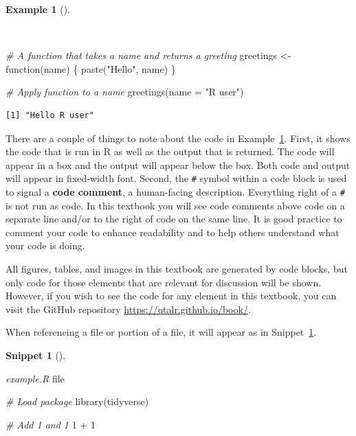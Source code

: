\documentclass[
  letterpaper,
  krantz1]{latex/krantz-mod}
\newenvironment{Shaded}{\begin{snugshade}}{\end{snugshade}}
\newcommand{\AttributeTok}[1]{\textcolor[rgb]{0.00,0.00,0.00}{#1}}
\newcommand{\CommentTok}[1]{\textcolor[rgb]{0.00,0.00,0.00}{\textit{#1}}}
\newcommand{\ControlFlowTok}[1]{\textcolor[rgb]{0.00,0.00,0.00}{#1}}
\newcommand{\DecValTok}[1]{\textcolor[rgb]{0.00,0.00,0.00}{#1}}
\newcommand{\FunctionTok}[1]{\textcolor[rgb]{0.00,0.00,0.00}{#1}}
\newcommand{\NormalTok}[1]{\textcolor[rgb]{0.00,0.00,0.00}{#1}}
\newcommand{\OtherTok}[1]{\textcolor[rgb]{0.00,0.00,0.00}{#1}}
\newcommand{\SpecialCharTok}[1]{\textcolor[rgb]{0.00,0.00,0.00}{#1}}
\newcommand{\StringTok}[1]{\textcolor[rgb]{0.00,0.00,0.00}{#1}}
\theoremstyle{definition}
\newtheorem{definition}{Snippet}[chapter]
\theoremstyle{definition}
\newtheorem{example}{Example}[chapter]
\theoremstyle{remark}
\begin{document}
\begin{example}[]\protect\hypertarget{exm-code-block}{}\label{exm-code-block}

~

\begin{Shaded}
\begin{Highlighting}[numbers=left,,]
\CommentTok{\# A function that takes a name and returns a greeting}
\NormalTok{greetings }\OtherTok{\textless{}{-}} \ControlFlowTok{function}\NormalTok{(name) \{}
  \FunctionTok{paste}\NormalTok{(}\StringTok{"Hello"}\NormalTok{, name)}
\NormalTok{\}}

\CommentTok{\# Apply function to a name}
\FunctionTok{greetings}\NormalTok{(}\AttributeTok{name =} \StringTok{"R user"}\NormalTok{) }
\end{Highlighting}
\end{Shaded}

\begin{verbatim}
[1] "Hello R user"
\end{verbatim}

\end{example}

 

There are a couple of things to note about the code in
Example~\ref{exm-code-block}. First, it shows the code that is run in R
as well as the output that is returned. The code will appear in a box
and the output will appear below the box. Both code and output will
appear in fixed-width font. Second, the \texttt{\#} symbol within a code
block is used to signal a \textbf{code comment}, a
human-facing description. Everything right of a \texttt{\#} is not run
as code. In this textbook you will see code comments above code on a
separate line and/or to the right of code on the same line. It is good
practice to comment your code to enhance readability and to help others
understand what your code is doing.

All figures, tables, and images in this textbook are generated by code
blocks, but only code for those elements that are relevant for
discussion will be shown. However, if you wish to see the code for any
element in this textbook, you can visit the GitHub repository
\url{https://qtalr.github.io/book/}.

When referencing a file or portion of a file, it will appear as in
Snippet~\ref{def-r-code}.

\begin{definition}[]\protect\hypertarget{def-r-code}{}\label{def-r-code}

\emph{example.R} file

\begin{Shaded}
\begin{Highlighting}[numbers=left,,]
\CommentTok{\# Load package}
\FunctionTok{library}\NormalTok{(tidyverse)}

\CommentTok{\# Add 1 and 1}
\DecValTok{1} \SpecialCharTok{+} \DecValTok{1}
\end{Highlighting}
\end{Shaded}

\end{definition}
\end{document}
